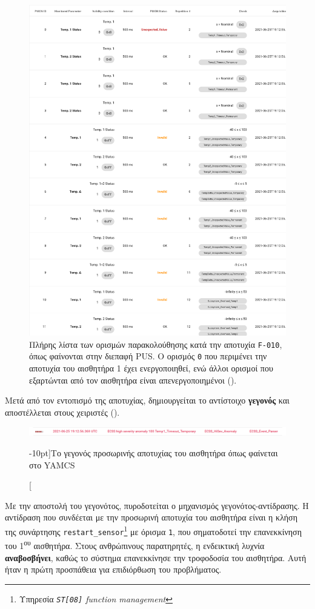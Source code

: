 \documentclass[a4paper,nobib]{tufte-book}
\begin{document}
\begin{figure}
	\centering
	\caption[Πλήρης λίστα των ορισμών παρακολούθησης κατά την αποτυχία \texttt{F-010}]{Πλήρης λίστα των ορισμών παρακολούθησης κατά την αποτυχία \texttt{F-010}, όπως φαίνονται στην διεπαφή 
	\acs{PUS}. Ο ορισμός \texttt{0} που περιμένει την αποτυχία του αισθητήρα 1 έχει ενεργοποιηθεί, ενώ άλλοι ορισμοί που εξαρτώνται από τον αισθητήρα είναι απενεργοποιημένοι (\invalid).}
	\label{fig:pusf010moni}
	\includegraphics[width=.8\textwidth]{media/screenshots/pus_f010_moni}
\end{figure}

Μετά από τον εντοπισμό της αποτυχίας, δημιουργείται το αντίστοιχο \textbf{γεγονός} και αποστέλλεται στους χειριστές ().

\begin{figure}
	\centering
	\includegraphics{media/screenshots/yamcs_f010_event}
	\caption[][-10pt]{Το γεγονός προσωρινής αποτυχίας του αισθητήρα όπως φαίνεται στο \acs{YAMCS}}
	\label{fig:yamcsf010event}
\end{figure}

Με την αποστολή του γεγονότος, πυροδοτείται ο μηχανισμός γεγονότος-αντίδρασης. Η αντίδραση που συνδέεται με την προσωρινή αποτυχία του αισθητήρα είναι η κλήση της συνάρτησης \texttt{restart\_sensor}\footnote{Υπηρεσία \emph{\texttt{ST[08]} function management}} με όρισμα \texttt{1}, που σηματοδοτεί την επανεκκίνηση του 1\textsuperscript{ου} αισθητήρα. Στους ανθρώπινους παρατηρητές, η ενδεικτική λυχνία \textbf{αναβοσβήνει}, καθώς το σύστημα επανεκκίνησε την τροφοδοσία του αισθητήρα. Αυτή ήταν η πρώτη προσπάθεια για επιδιόρθωση του προβλήματος.
\end{document}
